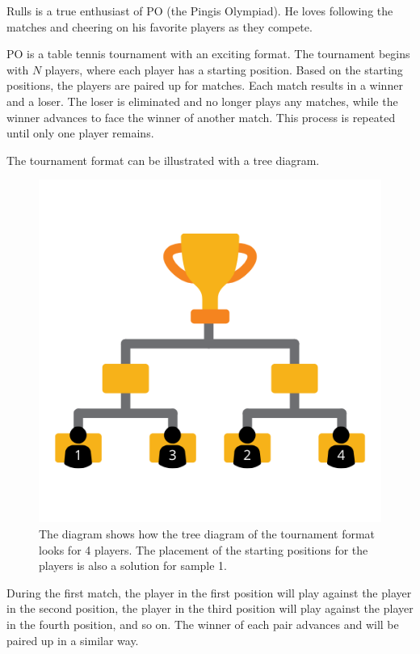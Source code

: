 \noindent

Rulls is a true enthusiast of PO (the Pingis Olympiad).  
He loves following the matches and cheering on his favorite players as they compete.

PO is a table tennis tournament with an exciting format.  
The tournament begins with $N$ players, where each player has a starting position.  
Based on the starting positions, the players are paired up for matches.  
Each match results in a winner and a loser.  
The loser is eliminated and no longer plays any matches,  
while the winner advances to face the winner of another match.  
This process is repeated until only one player remains.

The tournament format can be illustrated with a tree diagram.

\begin{centering}
  \begin{figure}[h]
      \centering
      \includegraphics[scale=0.7]{2.png}
    \caption{The diagram shows how the tree diagram of the tournament format looks for 4 players. The placement of the starting positions for the players is also a solution for sample 1.}
  \end{figure}
\end{centering}

During the first match, the player in the first position will play against the player in the second position, the player in the third position will play against the player in the fourth position, and so on.
The winner of each pair advances and will be paired up in a similar way.

